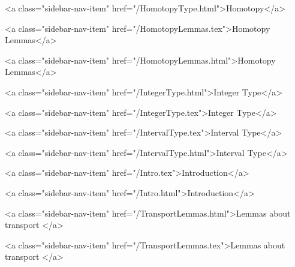       
    
      
        
          <a class="sidebar-nav-item" href="/HomotopyType.html">Homotopy</a>
        
      
    
      
        
          <a class="sidebar-nav-item" href="/HomotopyLemmas.tex">Homotopy Lemmas</a>
        
      
    
      
        
          <a class="sidebar-nav-item" href="/HomotopyLemmas.html">Homotopy Lemmas</a>
        
      
    
      
        
          <a class="sidebar-nav-item" href="/IntegerType.html">Integer Type</a>
        
      
    
      
        
          <a class="sidebar-nav-item" href="/IntegerType.tex">Integer Type</a>
        
      
    
      
        
          <a class="sidebar-nav-item" href="/IntervalType.tex">Interval Type</a>
        
      
    
      
        
          <a class="sidebar-nav-item" href="/IntervalType.html">Interval Type</a>
        
      
    
      
        
          <a class="sidebar-nav-item" href="/Intro.tex">Introduction</a>
        
      
    
      
        
          <a class="sidebar-nav-item" href="/Intro.html">Introduction</a>
        
      
    
      
        
          <a class="sidebar-nav-item" href="/TransportLemmas.html">Lemmas about transport </a>
        
      
    
      
        
          <a class="sidebar-nav-item" href="/TransportLemmas.tex">Lemmas about transport </a>
        
